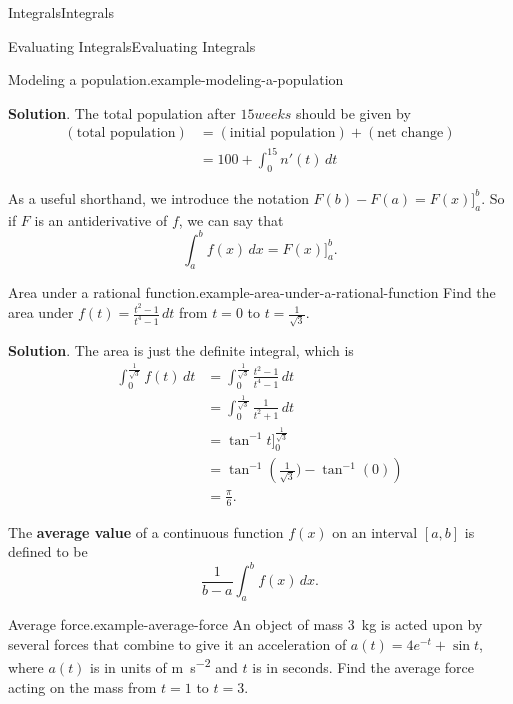 \documentclass[10pt,]{book}
\newcommand{\terminology}[1]{\textbf{#1}}
\numberwithin{equation}{section}
\begin{document}
\begin{chapterptx}{Integrals}{}{Integrals}{}{}
\begin{sectionptx}{Evaluating Integrals}{}{Evaluating Integrals}{}{}
\begin{example}{Modeling a population.}{example-modeling-a-population}
\par\smallskip%
\noindent\textbf{Solution}.\hypertarget{solution-97}{}\quad%
\hypertarget{p-448}{}%
The total population after \(15 weeks\) should be given by%
\begin{align*}
(\text{total population}) & = (\text{initial population}) + (\text{net change}) \\
& = 100 + \int_{0}^{15}n'(t)\,dt 
\end{align*}
%
\end{example}
\hypertarget{p-449}{}%
As a useful shorthand, we introduce the notation \(F(b) - F(a) = F(x)\big]_{a}^{b}.\) So if \(F\) is an antiderivative of \(f\), we can say that%
\begin{equation*}
\int_{a}^{b}f(x)\,dx = F(x)\big]_{a}^{b}.
\end{equation*}
%
\begin{example}{Area under a rational function.}{example-area-under-a-rational-function}%
\hypertarget{p-450}{}%
Find the area under \(f(t) = \frac{t^{2}-1}{t^{4}-1}\,dt\) from \(t=0\) to \(t=\frac{1}{\sqrt{3}}\).%
\par\smallskip%
\noindent\textbf{Solution}.\hypertarget{solution-98}{}\quad%
\hypertarget{p-451}{}%
The area is just the definite integral, which is%
\begin{align*}
\int_{0}^{\frac{1}{\sqrt{3}}}f(t)\,dt & = \int_{0}^{\frac{1}{\sqrt{3}}}\frac{t^{2}-1}{t^{4}-1}\,dt \\
& = \int_{0}^{\frac{1}{\sqrt{3}}}\frac{1}{t^{2}+1}\,dt \\
& = \tan^{-1}t\big]_{0}^{\frac{1}{\sqrt{3}}} \\
& = \tan^{-1}\left(\frac{1}{\sqrt{3}}) - \tan^{-1}(0)\right) \\
& = \frac{\pi}{6}. 
\end{align*}
%
\end{example}
\hypertarget{p-452}{}%
The \terminology{average value} of a continuous function \(f(x)\) on an interval \([a,b]\) is defined to be%
\begin{equation*}
\frac{1}{b-a}\int_{a}^{b}f(x)\,dx.
\end{equation*}
%
\begin{example}{Average force.}{example-average-force}%
\hypertarget{p-453}{}%
An object of mass \SI{3}{\kilo\gram} is acted upon by several forces that combine to give it an acceleration of \(a(t) = 4e^{-t} + \sin t\), where \(a(t)\) is in units of \si{\meter\per\second\tothe{2}} and \(t\) is in seconds. Find the average force acting on the mass from \(t=1\) to \(t=3\).%

\end{example}
\end{sectionptx}
\end{chapterptx}
\end{document}
